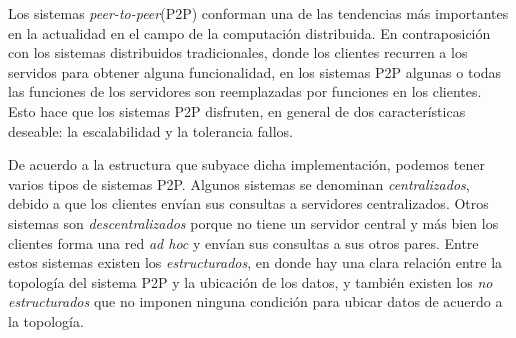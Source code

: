 Los sistemas \emph{peer-to-peer}(P2P) conforman una de las tendencias más importantes en la actualidad en el campo de la computación distribuida. En contraposición con los sistemas distribuidos tradicionales, donde los clientes recurren a los servidos  para obtener alguna funcionalidad, en los sistemas P2P algunas o todas las funciones de los servidores son reemplazadas por funciones en los clientes. Esto hace que los sistemas P2P disfruten, en general de dos características deseable: la escalabilidad y la tolerancia fallos.

De acuerdo a la estructura que subyace dicha implementación, podemos tener varios tipos de sistemas P2P. Algunos sistemas se denominan \emph{centralizados}, debido a que los clientes envían sus consultas a servidores centralizados. Otros sistemas son \emph{descentralizados} porque no tiene un servidor central y más bien los clientes forma una red \emph{ad hoc} y envían sus consultas a sus otros pares. Entre estos sistemas existen los \emph{estructurados}, en donde hay una clara relación entre la topología del sistema P2P y la ubicación de los datos, y también existen los \emph{no estructurados} que no imponen ninguna condición para ubicar datos de acuerdo a la topología.

